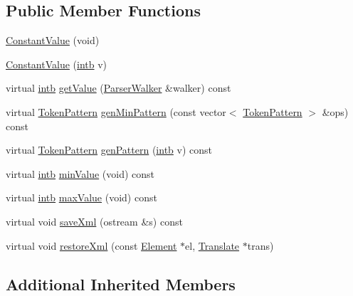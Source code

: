 \subsection*{Public Member Functions}
\begin{DoxyCompactItemize}
\item 
\mbox{\hyperlink{class_constant_value_a7fe5694cd83a579505e166e2bb5e2ca5}{Constant\+Value}} (void)
\item 
\mbox{\hyperlink{class_constant_value_a1b0fdc1faba5a705ece3195adc588971}{Constant\+Value}} (\mbox{\hyperlink{types_8h_aa925ba3e627c2df89d5b1cfe84fb8572}{intb}} v)
\item 
virtual \mbox{\hyperlink{types_8h_aa925ba3e627c2df89d5b1cfe84fb8572}{intb}} \mbox{\hyperlink{class_constant_value_ab43cd9c5b588e2b748bfeecb8ccc0fef}{get\+Value}} (\mbox{\hyperlink{class_parser_walker}{Parser\+Walker}} \&walker) const
\item 
virtual \mbox{\hyperlink{class_token_pattern}{Token\+Pattern}} \mbox{\hyperlink{class_constant_value_a8193ec263bd8e0ae1b736d7ae3cad291}{gen\+Min\+Pattern}} (const vector$<$ \mbox{\hyperlink{class_token_pattern}{Token\+Pattern}} $>$ \&ops) const
\item 
virtual \mbox{\hyperlink{class_token_pattern}{Token\+Pattern}} \mbox{\hyperlink{class_constant_value_a822cafedaecd1036f0eaf71ec34c6fc6}{gen\+Pattern}} (\mbox{\hyperlink{types_8h_aa925ba3e627c2df89d5b1cfe84fb8572}{intb}} v) const
\item 
virtual \mbox{\hyperlink{types_8h_aa925ba3e627c2df89d5b1cfe84fb8572}{intb}} \mbox{\hyperlink{class_constant_value_a559890921d7f3d3b4c1f84b38c5cb751}{min\+Value}} (void) const
\item 
virtual \mbox{\hyperlink{types_8h_aa925ba3e627c2df89d5b1cfe84fb8572}{intb}} \mbox{\hyperlink{class_constant_value_aa212eac1ed40169d08155c7fd83224e2}{max\+Value}} (void) const
\item 
virtual void \mbox{\hyperlink{class_constant_value_a03712496f11e48e4b860d10e20dca2e2}{save\+Xml}} (ostream \&s) const
\item 
virtual void \mbox{\hyperlink{class_constant_value_a93170b89c5eabd65c8f66501d584c60d}{restore\+Xml}} (const \mbox{\hyperlink{class_element}{Element}} $\ast$el, \mbox{\hyperlink{class_translate}{Translate}} $\ast$trans)
\end{DoxyCompactItemize}
\subsection*{Additional Inherited Members}


